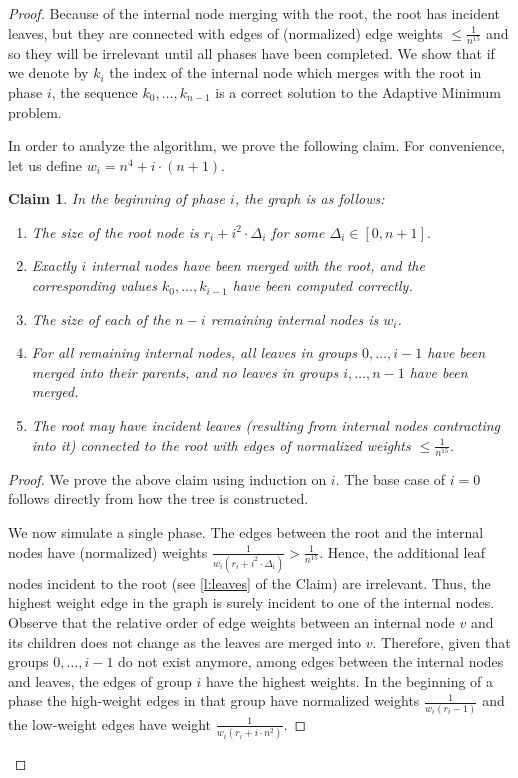 \documentclass[11pt]{article}
\newcommand{\am}{\textsf{Adaptive Minimum}\xspace}
\newtheorem{claim}{Claim}
\begin{document}
\begin{proof}
Because of the internal node merging with the root, the root has incident leaves, but they are connected with edges of (normalized) edge weights $\leq \frac{1}{n^{15}}$ and so they will be irrelevant until all phases have been completed.
We  show that if we denote by $k_i$ the index of the internal node which merges with the root in phase $i$, the sequence $k_0, \ldots, k_{n-1}$ is a correct solution to the \am problem. 



In order to analyze the algorithm, we prove the following claim.
For convenience, let us define $w_i = n^4 + i \cdot (n+1)$. %

\begin{claim}
In the beginning of phase $i$, the graph is as follows:
\begin{enumerate}
    \item The size of the root node is $r_i+ i^2 \cdot \Delta_i$ for some $\Delta_i \in [0, n+1]$.\label{l:rootweight}
    \item Exactly $i$ internal nodes have been merged with the root, and the corresponding values $k_0, \ldots, k_{i-1}$ have been computed correctly.\label{l:correct}
    \item The size of each of the $n-i$ remaining internal nodes is $w_i$.\label{l:intweight}
    \item For all remaining internal nodes, \emph{all} leaves in groups $0, \ldots, i-1$ have been merged into their parents, and no leaves in groups $i, \ldots, n-1$ have been merged.\label{l:groups}
    \item The root may have incident leaves (resulting from internal nodes contracting into it) connected to the root with edges of normalized weights $\leq \frac{1}{n^{15}}$.\label{l:leaves}
\end{enumerate}
\end{claim}
\begin{proof}
We prove the above claim using induction on $i$.
The base case of $i=0$ follows directly from how the tree is constructed.

We now simulate a single phase.
The edges between the root and the internal nodes have (normalized) weights $\frac{1}{w_i(r_i + i^2 \cdot \Delta_i)} > \frac{1}{n^{15}}$.
Hence, the additional leaf nodes incident to the root (see \cref{l:leaves} of the Claim) are irrelevant.
Thus, the highest weight edge in the graph is surely incident to one of the internal nodes.
Observe that the relative order of edge weights between an internal node $v$ and its children does not change as the leaves are merged into $v$.
Therefore, given that groups $0, \ldots, i-1$ do not exist anymore, among edges between the internal nodes and leaves, the edges of group $i$ have the highest weights.
In the beginning of a phase the high-weight edges in that group have normalized weights $\frac{1}{w_i(r_i -1)}$ and the low-weight edges have weight $\frac{1}{w_i (r_i + i \cdot n^2)}$.


\end{proof}
\end{proof}
\end{document}
